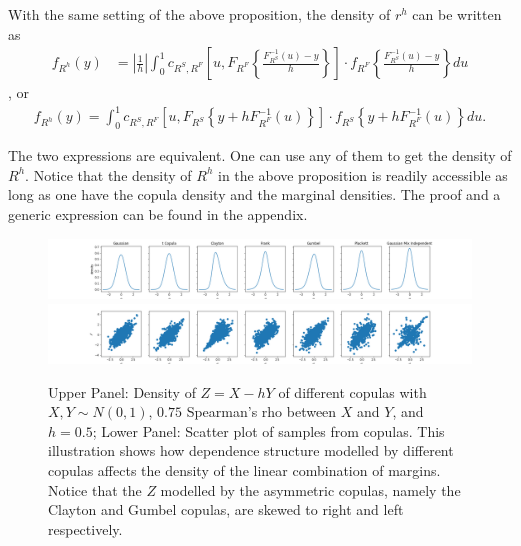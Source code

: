 \documentclass[11pt,a4paper,english]{article}
\begin{document}
\begin{proposition} With the same setting of the above proposition, the density of $r^h$ can be written as
  \begin{align}
  f_{R^h}(y) &= \left|\frac{1}{h}\right|\int_0^1 c_{R^S, R^F} \left[u,
  F_{R^F}\left\{\frac{F^{-1}_{R^S}(u)-y}{h}\right\}
  \right]
   \cdot
  f_{R^F}
  \left\{\frac{F^{-1}_{R^S}(u)-y}{h}\right\} du \label{eq:density1}
  \end{align}, or
    \begin{align}
      f_{R^h}(y)
      = \int_0^1 c_{R^S, R^F} \left[u,
      F_{R^S}\left\{y + h F^{-1}_{R^F}(u)\right\}
      \right]
       \cdot
      f_{R^S}
      \left\{
      y+ hF^{-1}_{R^F}(u)
      \right\} du.\label{eq:density2}
  \end{align}
  \end{proposition}
The two expressions are equivalent.
One can use any of them to get the density of $R^h$.
Notice that the density of $R^h$ in the above proposition is readily accessible as long as one have
the copula density and the marginal densities.
The proof and a generic expression can be found in the appendix.
\begin{figure}[h]
\includegraphics[width=\textwidth]{_pics/density illustration1.png}
\includegraphics[width=\textwidth]{_pics/density illustration2.png}
  \caption{Upper Panel: Density of $Z= X - hY$ of different copulas with
  $X, Y \sim N(0,1)$,
  $0.75$ Spearman's rho between $X$ and $Y$, and $h=0.5$;
  Lower Panel: Scatter plot of samples from copulas.
  This illustration shows how dependence structure modelled by different copulas affects the density of the linear combination
  of margins.
  Notice that the $Z$ modelled by the asymmetric copulas, namely the Clayton and Gumbel copulas, are skewed to right
  and left respectively.}
\label{fig:density illustration}
\end{figure}
\end{document}
